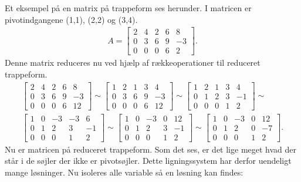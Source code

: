 \begin{eks}
Et eksempel på en matrix på trappeform ses herunder. I matricen er pivotindgangene (1,1), (2,2) og (3,4).
\begin{align*}
A= \begin{bmatrix}
2 & 4 & 2 & 6 & 8 \\
0 & 3 & 6 & 9 & -3 \\
0 & 0 & 0 & 6 & 2
\end{bmatrix}. 
\end{align*}
Denne matrix reduceres nu ved hjælp af rækkeoperationer til reduceret trappeform.\\
\begin{align*}
\begin{bmatrix}
2 & 4 & 2 & 6 & 8 \\
0 & 3 & 6 & 9 & -3 \\
0 & 0 & 0 & 6 & 12
\end{bmatrix}
\sim
\begin{bmatrix}
1 & 2 & 1 & 3 & 4 \\
0 & 3 & 6 & 9 & -3 \\
0 & 0 & 0 & 6 & 12
\end{bmatrix}
\sim
\begin{bmatrix}
1 & 2 & 1 & 3 & 4 \\
0 & 1 & 2 & 3 & -1 \\
0 & 0 & 0 & 1 & 2
\end{bmatrix}
\sim \\
\begin{bmatrix}
1 & 0 & -3 & -3 & 6 \\
0 & 1 & 2 & 3 & -1 \\
0 & 0 & 0 & 1 & 2
\end{bmatrix}
\sim
\begin{bmatrix}
1 & 0 & -3 & 0 & 12 \\
0 & 1 & 2 & 3 & -1 \\
0 & 0 & 0 & 1 & 2
\end{bmatrix}
\sim
\begin{bmatrix}
1 & 0 & -3 & 0 & 12 \\
0 & 1 & 2 & 0 & -7 \\
0 & 0 & 0 & 1 & 2
\end{bmatrix}.
\end{align*}
Nu er matricen på reduceret trappeform. Som det ses, er det lige meget hvad der står i de søjler der ikke er pivotsøjler. Dette ligningssystem har derfor uendeligt mange løsninger. Nu isoleres alle variable så en løsning kan findes:
\begin{align*}

\end{align*}
\end{eks}
